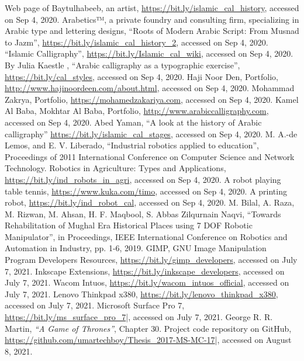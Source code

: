 \begin{thebibliography}{99}
 Web page of Baytulhabeeb, an artist, \url{https://bit.ly/islamic_cal_history}, accessed on Sep 4, 2020.
 Arabetics™, a private foundry and consulting firm, specializing in Arabic type and lettering designs, “Roots of Modern Arabic Script:  From Musnad to Jazm”, \url{https://bit.ly/islamic_cal_history_2}, accessed on Sep 4, 2020.
 “Islamic Calligraphy”, \url{https://bit.ly/Islamic_cal_wiki}, accessed on Sep 4, 2020.
 By Julia Kaestle , “Arabic calligraphy as a typographic exercise”, \url{https://bit.ly/cal_styles}, accessed on Sep 4, 2020.
 Haji Noor Den, Portfolio, \url{http://www.hajinoordeen.com/about.html}, accessed on Sep 4, 2020.
 Mohammad Zakrya, Portfolio, \url{https://mohamedzakariya.com}, accessed on Sep 4, 2020.
 Kamel Al Baba, Mokhtar Al Baba, Portfolio, \url{http://www.arabiccalligraphy.com}, accessed on Sep 4, 2020.
 Abed Yaman, “A look at the history of Arabic calligraphy” \url{https://bit.ly/islamic_cal_stages}, accessed on Sep 4, 2020.
 M. A.-de Lemos, and E. V. Liberado, “Industrial robotics applied to education”, Proceedings of 2011 International Conference on Computer Science and Network Technology.
 Robotics in Agriculture: Types and Applications, \url{https://bit.ly/ind_robots_in_agri}, accessed on Sep 4, 2020.
 A robot playing table tennis, \url{https://www.kuka.com/timo}, accessed on Sep 4, 2020.
 A printing robot, \url{https://bit.ly/ind_robot_cal}, accessed on Sep 4, 2020.
 M. Bilal, A. Raza, M. Rizwan, M. Ahsan, H. F. Maqbool, S. Abbas Zilqurnain Naqvi, “Towards Rehabilitation of Mughal Era Historical Places using 7 DOF Robotic Manipulator”, in Proceedings, IEEE International Conference on Robotics and Automation in Industry, pp. 1-6, 2019.
 GIMP, GNU Image Manipulation Program Developers Resources, \url{https://bit.ly/gimp_developers}, accessed on July 7, 2021.
 Inkscape Extensions, \url{https://bit.ly/inkscape_developers}, accessed on July 7, 2021.
 Wacom Intuos, \url{https://bit.ly/wacom_intuos_official}, accessed on July 7, 2021.
 Lenovo Thinkpad x380, \url{https://bit.ly/lenovo_thinkpad_x380}, accessed on July 7, 2021.
 Microsoft Surface Pro 7, \url{https://bit.ly/ms_surface_pro_7}|, accessed on July 7, 2021.
 George R. R. Martin, \emph{``A Game of Thrones''}, Chapter $30$.
 Project code repository on GitHub, \url{https://github.com/umartechboy/Thesis_2017-MS-MC-17}|, accessed on August 8, 2021.
    \end{thebibliography} 